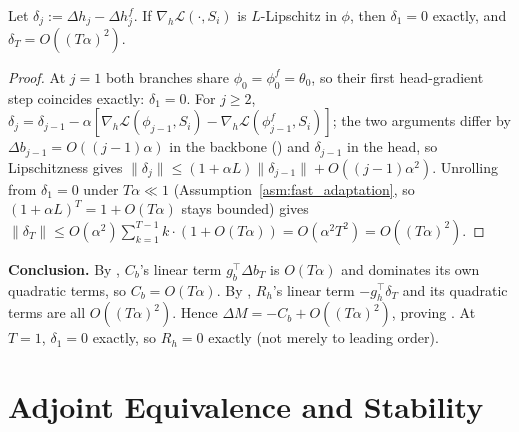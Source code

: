 \begin{lemma}
\label{lem:head_div}
Let $\delta_j:=\Delta h_j-\Delta h_j^f$. If $\nabla_h\mathcal{L}(\cdot,S_i)$ is $L$-Lipschitz in $\phi$, then $\delta_1=0$ exactly, and $\delta_T=O((T\alpha)^2)$.
\end{lemma}
\begin{proof}
At $j{=}1$ both branches share $\phi_0=\phi_0^f=\theta_0$, so their first head-gradient step coincides exactly: $\delta_1=0$. For $j\ge2$, $\delta_j=\delta_{j-1}-\alpha[\nabla_h\mathcal{L}(\phi_{j-1},S_i)-\nabla_h\mathcal{L}(\phi_{j-1}^f,S_i)]$; the two arguments differ by $\Delta b_{j-1}=O((j{-}1)\alpha)$ in the backbone () and $\delta_{j-1}$ in the head, so Lipschitzness gives $\|\delta_j\|\le(1{+}\alpha L)\|\delta_{j-1}\|+O((j{-}1)\alpha^2)$. Unrolling from $\delta_1=0$ under $T\alpha\ll1$ (Assumption~\ref{asm:fast_adaptation}, so $(1+\alpha L)^{T}=1+O(T\alpha)$ stays bounded) gives $\|\delta_T\|\le O(\alpha^2)\sum_{k=1}^{T-1}k\cdot(1+O(T\alpha))=O(\alpha^2T^2)=O((T\alpha)^2)$.
\end{proof}

\noindent\textbf{Conclusion.} By , $C_b$'s linear term $g_b^\top\Delta b_T$ is $O(T\alpha)$ and dominates its own quadratic terms, so $C_b=O(T\alpha)$. By , $R_h$'s linear term $-g_h^\top\delta_T$ and its quadratic terms are all $O((T\alpha)^2)$. Hence $\Delta M=-C_b+O((T\alpha)^2)$, proving . At $T{=}1$, $\delta_1{=}0$ exactly, so $R_h{=}0$ exactly (not merely to leading order).

\section{Adjoint Equivalence and Stability}
\label{sec:supp_adjoint}

